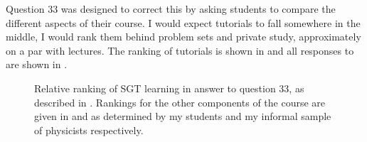 Question 33 was designed to correct this by asking students to compare the different aspects of their course. I would expect tutorials to fall somewhere in the middle, I would rank them behind problem sets and private study, approximately on a par with lectures. The ranking of tutorials is shown in  and all responses to are shown in .
\begin{figure}
  \centering
    \quad
\caption{Relative ranking of SGT learning in answer to question 33, as described in . Rankings for the other components of the course are given in  and  as determined by my students and my informal sample of physicists respectively.}
  \label{fig:tutor-rank}
\end{figure}
